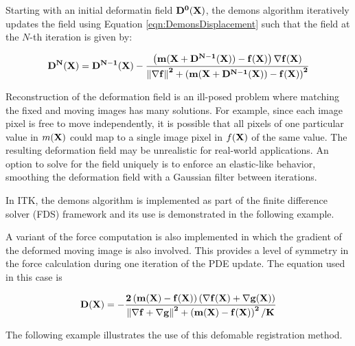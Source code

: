Starting with an initial deformatin field $\bf{D}^{0}(\bf{X})$, the demons
algorithm iteratively updates the field using Equation
\ref{eqn:DemonsDisplacement} such that the field at the $N$-th iteration is
given by:

\begin{equation}
\bf{D}^{N}(\bf{X}) = \bf{D}^{N-1}(\bf{X}) - \frac
{\left(  m(\bf{X}+ \bf{D}^{N-1}(\bf{X})) 
- f(\bf{X}) \right) \nabla f(\bf{X})}
{\left\|  \nabla f \right\|^2 + \left(  
m(\bf{X}+ \bf{D}^{N-1}(\bf{X}) )
 - f(\bf{X}) \right)^2 } 
\label{eqn:DemonsUpdateEquation}
\end{equation}

Reconstruction of the deformation field is an ill-posed problem where
matching the fixed and moving images has many solutions. For example, since
each image pixel is free to move independently, it is possible that all
pixels of one particular value in $m(\bf{X})$ could map to a single image
pixel in $f(\bf{X})$ of the same value. The resulting deformation field may
be unrealistic for real-world applications. An option to solve for the field
uniquely is to enforce an elastic-like behavior, smoothing the deformation
field with a Gaussian filter between iterations.

In ITK, the demons algorithm is implemented as part of the finite difference
solver (FDS) framework and its use is demonstrated in the following example.

 

A variant of the force computation is also implemented in which the gradient of
the deformed moving image is also involved. This provides a level of symmetry
in the force calculation during one iteration of the PDE update. The equation
used in this case is

\begin{equation}
\bf{D}(\bf{X}) = - \frac
{2 \left(  m(\bf{X}) - f(\bf{X}) \right) \left(  \nabla f(\bf{X}) +  \nabla g(\bf{X}) \right) }
{\left\|  \nabla f + \nabla g \right\|^2 + \left(  m(\bf{X}) - f(\bf{X}) \right)^2 / K } 
\label{eqn:DemonsDisplacement}
\end{equation}

The following example illustrates the use of this defomable registration
method.

 



